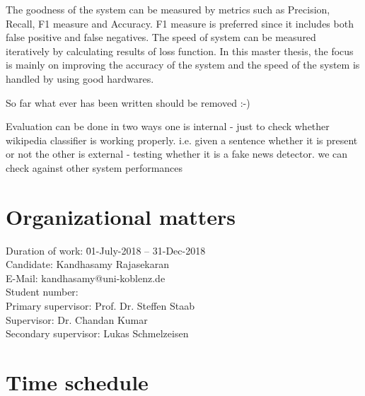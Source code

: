 \documentclass[a4paper, 11pt]{article}
\makeatletter
\newcommand{\myName}{Kandhasamy Rajasekaran}
\newcommand{\emailID}{kandhasamy@uni-koblenz.de}
\newcommand{\matriculationID}{216100855}
\newcommand{\StartDate}{01-July-2018}
\newcommand{\EndDate}{31-Dec-2018}
\newcommand{\expert}{Prof. Dr. Steffen Staab}%
\newcommand{\supervisor}{Dr. Chandan Kumar} %
\newcommand{\secondSupervisor}{Lukas Schmelzeisen} %
\makeatother
\begin{document}
The goodness of the system can be measured by metrics such as Precision, Recall, F1 measure and Accuracy. F1 measure is preferred since it includes both false positive and false negatives. The speed of system can be measured iteratively by calculating results of loss function. In this master thesis, the focus is mainly on improving the accuracy of the system and the speed of the system is handled by using good hardwares. 

So far what ever has been written should be removed :-)

Evaluation can be done in two ways
one is internal - just to check whether wikipedia classifier is working properly. i.e. given a sentence whether it is present or not
the other is external - testing whether it is a fake news detector. we can check against other system performances


\newpage

\section{Organizational matters}

\begin{tabbing}
Duration of work: \hspace{1.1cm} \= \StartDate{} -- \EndDate{}\\
\vspace{0.5ex}Candidate:	\> \myName{}\\
\vspace{0.5ex}E-Mail:	\> \emailID{}\\
\vspace{0.5ex}Student number: \> \matriculationID{}\\
\vspace{0.5ex}Primary supervisor: \> \expert{}\\
Supervisor: \> \supervisor{}\\
Secondary supervisor: \> \secondSupervisor{}\\
\end{tabbing}


\section{Time schedule}
\end{document}
